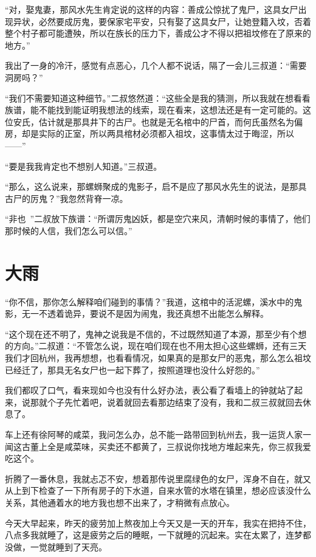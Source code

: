 “对，娶鬼妻，那风水先生肯定说的这样的内容：善成公惊扰了鬼尸，这具女尸出现异状，必然要成厉鬼，要保家宅平安，只有娶了这具女尸，让她登籍入坟，否着整个村子都可能遭殃，所以在族长的压力下，善成公才不得以把祖坟修在了原来的地方。”

我出了一身的冷汗，感觉有点恶心，几个人都不说话，隔了一会儿三叔道：“需要洞房吗？”

“我们不需要知道这种细节。”二叔悠然道：“这些全是我的猜测，所以我就在想看看族谱，能不能找到能证明我想法的线索，现在看来，这想法还是有一定可能的。这位安氏，估计就是那具井下的古尸。也就是无名棺中的尸首，而何氏虽然名为偏房，却是实际的正室，所以两具棺材必须都入祖坟，这事情太过于晦涩，所以——”

“要是我我肯定也不想别人知道。”三叔道。

“那么，这么说来，那螺蛳聚成的鬼影子，启不是应了那风水先生的说法，是那具古尸的厉鬼？”我忽然背脊一凉。

“非也~”二叔放下族谱：“所谓厉鬼凶妖，都是空穴来风，清朝时候的事情了，他们那时候的人信，我们怎么可以信。”

\chapter{大雨}

“你不信，那你怎么解释咱们碰到的事情？”我道，这棺中的活泥螺，溪水中的鬼影，无一不透着诡异，要说不是因为闹鬼，我还真想不出能怎么解释。

“这个现在还不明了，鬼神之说我是不信的，不过既然知道了本源，那至少有个想的方向。”二叔道：“不管怎么说，现在咱们现在也不用太担心这些螺蛳，还有三天我们才回杭州，我再想想，也看看情况，如果真的是那女尸的恶鬼，那么怎么祖坟已经迁了，那具无名女尸也一起下葬了，按照道理也没什么好怨的。”

我们都叹了口气，看来现如今也没有什么好办法，表公看了看墙上的钟就站了起来，说那就个子先忙着吧，说着就回去看那边结束了没有，我和二叔三叔就回去休息了。

车上还有徐阿琴的咸菜，我问怎么办，总不能一路带回到杭州去，我一运货人家一闻这古董上全是咸菜味，买卖还不都黄了，三叔说你找地方堆起来先，你三叔我爱吃这个。

折腾了一番休息，我就忐忑不安，想着那传说里腐绿色的女尸，浑身不自在，就又从上到下检查了一下所有房子的下水道，自来水管的水塔在镇里，想必应该没什么关系，其他通着水的地方我也想不出来了，才稍微有点放心。

今天大早起来，昨天的疲劳加上熬夜加上今天又是一天的开车，我实在把持不住，八点多我就睡了，这是疲劳之后的睡眠，一下就睡的沉起来。实在太累了，连梦都没做，一觉就睡到了天亮。

